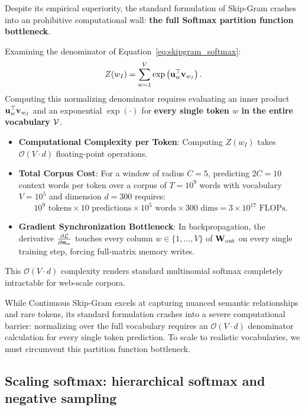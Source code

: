 \documentclass[../../../main.tex]{subfiles}
\begin{document}
Despite its empirical superiority, the standard formulation of Skip-Gram crashes into an prohibitive computational wall: \textbf{the full Softmax partition function bottleneck}.

Examining the denominator of Equation~\eqref{eq:skipgram_softmax}:
\begin{equation}
\label{eq:partition_function}
Z(w_I) = \sum_{w=1}^V \exp\left( \mathbf{u}_w^\top \mathbf{v}_{w_I} \right).
\end{equation}
Computing this normalizing denominator requires evaluating an inner product $\mathbf{u}_w^\top \mathbf{v}_{w_I}$ and an exponential $\exp(\cdot)$ for \textbf{every single token $w$ in the entire vocabulary $\mathcal{V}$}.
\begin{itemize}
    \item \textbf{Computational Complexity per Token}: Computing $Z(w_I)$ takes $\mathcal{O}(V \cdot d)$ floating-point operations.
    \item \textbf{Total Corpus Cost}: For a window of radius $C = 5$, predicting $2C = 10$ context words per token over a corpus of $T = 10^9$ words with vocabulary $V = 10^5$ and dimension $d = 300$ requires:
    \begin{equation}
    \label{eq:flops_wall}
    10^9 \text{ tokens} \times 10 \text{ predictions} \times 10^5 \text{ words} \times 300 \text{ dims} = 3 \times 10^{17} \text{ FLOPs}.
    \end{equation}
    \item \textbf{Gradient Synchronization Bottleneck}: In backpropagation, the derivative $\frac{\partial \mathcal{L}}{\partial \mathbf{u}_w}$ touches every column $w \in \{1, \dots, V\}$ of $\mathbf{W}_{\text{out}}$ on every single training step, forcing full-matrix memory writes.
\end{itemize}
This $\mathcal{O}(V \cdot d)$ complexity renders standard multinomial softmax completely intractable for web-scale corpora.

While Continuous Skip-Gram excels at capturing nuanced semantic relationships and rare tokens, its standard formulation crashes into a severe computational barrier: normalizing over the full vocabulary requires an $\mathcal{O}(V \cdot d)$ denominator calculation for every single token prediction. To scale to realistic vocabularies, we must circumvent this partition function bottleneck.

\clearpage


\subsection{Scaling softmax: hierarchical softmax and negative sampling}
\label{sec:scaling_softmax}
\end{document}
